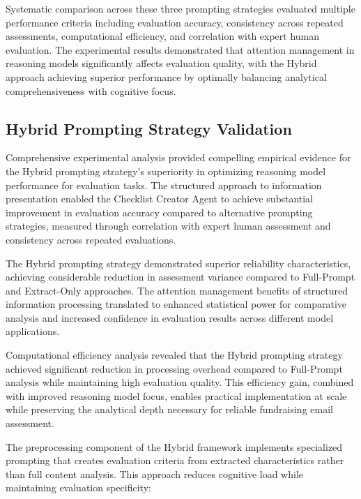 Systematic comparison across these three prompting strategies evaluated multiple performance criteria including evaluation accuracy, consistency across repeated assessments, computational efficiency, and correlation with expert human evaluation. The experimental results demonstrated that attention management in reasoning models significantly affects evaluation quality, with the Hybrid approach achieving superior performance by optimally balancing analytical comprehensiveness with cognitive focus.

\subsection{Hybrid Prompting Strategy Validation}

Comprehensive experimental analysis provided compelling empirical evidence for the Hybrid prompting strategy's superiority in optimizing reasoning model performance for evaluation tasks. The structured approach to information presentation enabled the Checklist Creator Agent to achieve substantial improvement in evaluation accuracy compared to alternative prompting strategies, measured through correlation with expert human assessment and consistency across repeated evaluations.

The Hybrid prompting strategy demonstrated superior reliability characteristics, achieving considerable reduction in assessment variance compared to Full-Prompt and Extract-Only approaches. The attention management benefits of structured information processing translated to enhanced statistical power for comparative analysis and increased confidence in evaluation results across different model applications.

Computational efficiency analysis revealed that the Hybrid prompting strategy achieved significant reduction in processing overhead compared to Full-Prompt analysis while maintaining high evaluation quality. This efficiency gain, combined with improved reasoning model focus, enables practical implementation at scale while preserving the analytical depth necessary for reliable fundraising email assessment.

The preprocessing component of the Hybrid framework implements specialized prompting that creates evaluation criteria from extracted characteristics rather than full content analysis. This approach reduces cognitive load while maintaining evaluation specificity:

